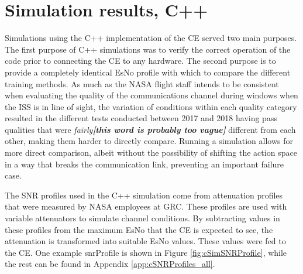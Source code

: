 \section{Simulation results, C++}
\par Simulations using the C++ implementation of the CE served two main purposes. The first purpose of C++ simulations was to verify the correct operation of the code prior to connecting the CE to any hardware. The second purpose is to provide a completely identical EsNo profile with which to compare the different training methods. As much as the NASA flight staff intends to be consistent when evaluating the quality of the communications channel during windows when the ISS is in line of sight, the variation of conditions within each quality category resulted in the different tests conducted between 2017 and 2018 having pass qualities that were \textit{fairly\textbf{[this word is probably too vague]}} different from each other, making them harder to directly compare. Running a simulation allows for more direct comparison, albeit without the possibility of shifting the action space in a way that breaks the communication link, preventing an important failure case.
\par The SNR profiles used in the C++ simulation come from attenuation profiles that were measured by NASA employees at GRC. These profiles are used with variable attenuators to simulate channel conditions. By subtracting values in these profiles from the maximum EsNo that the CE is expected to see, the attenuation is transformed into suitable EsNo values. These values were fed to the CE. One example snrProfile is shown in Figure \ref{fig:cSimSNRProfile}, while the rest can be found in Appendix \ref{app:cSNRProfiles_all}. 

